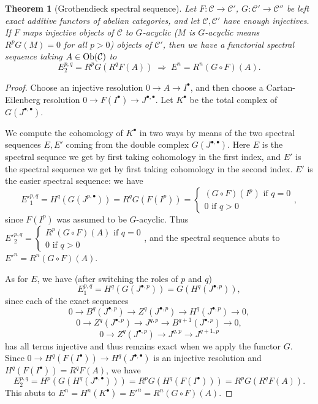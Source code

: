 \documentclass[letterpaper,11pt]{article}
\newtheorem{thm}{Theorem}
\theoremstyle{definition}
\theoremstyle{remark}
\begin{document}
\begin{thm}[Grothendieck spectral sequence]\label{spectral} Let $F: \mathcal{C}\rightarrow \mathcal{C}'$, $G:\mathcal{C'}\rightarrow \mathcal{C''}$ be left exact additive functors of abelian categories, and let $\mathcal{C}, \mathcal{C'}$ have enough injectives. If $F$ maps injective objects of $\mathcal{C}$ to $G$-acyclic ($M$ is $G$-acyclic means $R^pG(M) = 0$ for all $p > 0$) objects of $\mathcal{C}'$, then we have a functorial spectral sequence taking $A\in \mbox{\rm Ob}(\mathcal{C})$ to
\[
E^{p,q}_2 = R^pG(R^qF(A)) \; \Rightarrow \; E^n = R^n(G\circ F)(A).
\]
\end{thm}
\begin{proof} Choose an injective resolution $0 \rightarrow A \rightarrow I^\bullet$, and then choose a Cartan-Eilenberg resolution $0 \rightarrow F(I^\bullet) \rightarrow J^{\bullet,\bullet}$. Let $K^\bullet$ be the total complex of $G(J^{\bullet,\bullet})$.

We compute the cohomology of $K^\bullet$ in two ways by means of the two spectral sequences $E,E'$ coming from the double complex $G(J^{\bullet,\bullet})$. Here $E$ is the spectral sequnce we get by first taking cohomology in the first index, and $E'$ is the spectral sequence we get by first taking cohomology in the second index. $E'$ is the easier spectral sequence: we have
\[
E'^{p,q}_1 = H^q(G(J^{p,\bullet})) = R^qG(F(I^p)) = \begin{cases}(G\circ F)(I^p) \mbox{ if } q = 0\\
0 \mbox{ if } q > 0\end{cases},
\]
since $F(I^p)$ was assumed to be $G$-acyclic. Thus $E'^{p,q}_2 = \begin{cases}R^p(G\circ F)(A) \mbox{ if } q = 0\\ 0 \mbox{ if } q > 0\end{cases}$, and the spectral sequence abuts to $E'^n = R^n(G\circ F)(A)$.

As for $E$, we have (after switching the roles of $p$ and $q$)
\[
E^{p,q}_1 = H^q(G(J^{\bullet,p})) = G(H^q(J^{\bullet,p})),
\]
since each of the exact sequences
\[
0 \rightarrow B^q(J^{\bullet,p}) \rightarrow Z^q(J^{\bullet,p}) \rightarrow H^q(J^{\bullet,p}) \rightarrow 0,
\]
\[
0 \rightarrow Z^q(J^{\bullet,p}) \rightarrow J^{q,p} \rightarrow B^{q+1}(J^{\bullet,p}) \rightarrow 0,
\]
\[
0 \rightarrow Z^q(J^{\bullet,p}) \rightarrow J^{q,p} \rightarrow J^{q+1,p}
\]
has all terms injective and thus remains exact when we apply the functor $G$. Since $0 \rightarrow H^q(F(I^\bullet)) \rightarrow H^q(J^{\bullet,\bullet})$ is an injective resolution and $H^q(F(I^\bullet)) = R^qF(A)$, we have
\[
E^{p,q}_2 = H^p(G(H^q(J^{\bullet,\bullet}))) = R^pG(H^q(F(I^\bullet))) = R^pG(R^qF(A)).
\]
This abuts to $E^n = H^n(K^\bullet) = E'^n = R^n(G\circ F)(A)$.
\end{proof}
\end{document}
